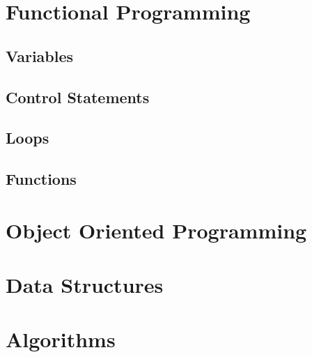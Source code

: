 \documentclass[10pt,a4paper,titlepage]{book}
\begin{document}
\chapter{Functional Programming}

\vfill
\pagebreak
\section{Variables}


\section{Control Statements}


\section{Loops}


\section{Functions}


\chapter{Object Oriented Programming}

\vfill
\pagebreak
\chapter{Data Structures}

\vfill
\pagebreak
\chapter{Algorithms}

\vfill
\pagebreak
\end{document}

